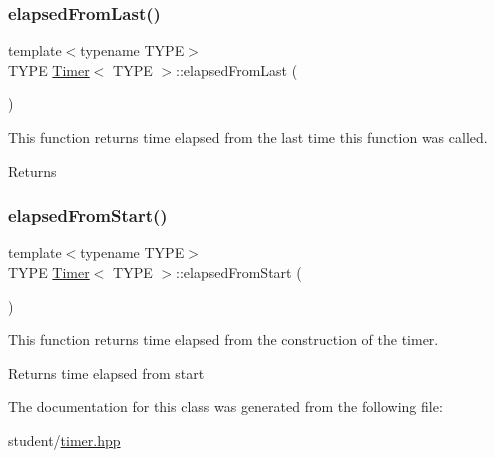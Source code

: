 \subsubsection{\texorpdfstring{elapsed\+From\+Last()}{elapsedFromLast()}}
{\footnotesize\ttfamily template$<$typename T\+Y\+PE$>$ \\
T\+Y\+PE \hyperlink{classTimer}{Timer}$<$ T\+Y\+PE $>$\+::elapsed\+From\+Last (\begin{DoxyParamCaption}{ }\end{DoxyParamCaption})\hspace{0.3cm}{\ttfamily [inline]}}



This function returns time elapsed from the last time this function was called. 

\begin{DoxyReturn}{Returns}

\end{DoxyReturn}
\mbox{\label{classTimer_ac04d0efef266558d59d647c769d2738d}} 
\subsubsection{\texorpdfstring{elapsed\+From\+Start()}{elapsedFromStart()}}
{\footnotesize\ttfamily template$<$typename T\+Y\+PE$>$ \\
T\+Y\+PE \hyperlink{classTimer}{Timer}$<$ T\+Y\+PE $>$\+::elapsed\+From\+Start (\begin{DoxyParamCaption}{ }\end{DoxyParamCaption})\hspace{0.3cm}{\ttfamily [inline]}}



This function returns time elapsed from the construction of the timer. 

\begin{DoxyReturn}{Returns}
time elapsed from start 
\end{DoxyReturn}


The documentation for this class was generated from the following file\+:\begin{DoxyCompactItemize}
\item 
student/\hyperlink{timer_8hpp}{timer.\+hpp}\end{DoxyCompactItemize}
